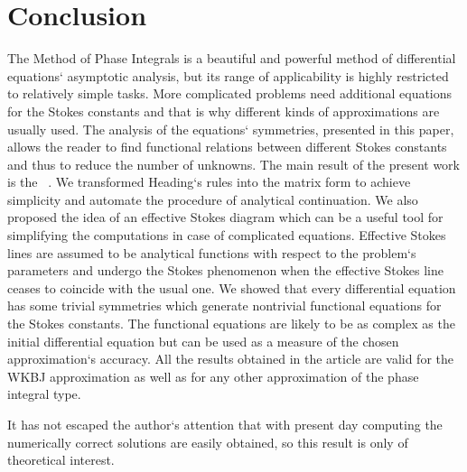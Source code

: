 \documentclass[12pt]{iopart}
\begin{document}

\section{Conclusion \label{CNCLSNS}}

The Method of Phase Integrals is a beautiful and powerful method of differential equations` asymptotic analysis, but its range of applicability is highly restricted to relatively simple tasks. More complicated problems need additional equations for the Stokes constants and that is why different kinds of approximations \cite{white,ours} are usually used. The analysis of the equations` symmetries, presented in this paper, allows the reader to find functional relations between different Stokes constants and thus to reduce the number of unknowns. The main result of the present work is the ~. We transformed Heading`s rules \cite{heading,white} into the matrix form to achieve simplicity and automate the procedure of analytical continuation. We also proposed the idea of an effective Stokes diagram which can be a useful tool for simplifying the computations in case of complicated equations. Effective Stokes lines are assumed to be analytical functions with respect to the problem`s parameters and undergo the Stokes phenomenon when the effective Stokes line ceases to coincide with the usual one. We showed that every differential equation has some trivial symmetries which generate nontrivial functional equations for the Stokes constants. The functional equations are likely to be as complex as the initial differential equation but can be used as a measure of the chosen approximation`s accuracy. All the results obtained in the article are valid for the WKBJ approximation as well as for any other approximation of the phase integral type.

It has not escaped the author`s attention that with present day computing the numerically correct solutions are easily obtained, so this result is only of theoretical interest.

\end{document}
